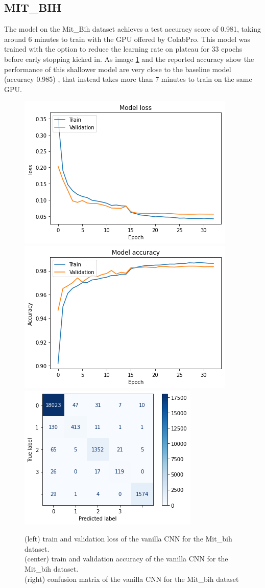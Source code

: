 \documentclass[11pt]{scrartcl}
\begin{document}
\subsection{MIT\_BIH}
The model on the Mit\_Bih dataset achieves a test accuracy score of 0.981, taking around 6 minutes to train with the GPU offered by ColabPro. This model was trained with the option to reduce the learning rate on plateau for 33 epochs before early stopping kicked in.
As image \ref{fig:cnn_mit_three} and the reported accuracy show the performance of this shallower model are very close to the baseline model (accuracy 0.985) , that instead takes more than 7 minutes to train on the same GPU.
\begin{figure}[htp]
\centering
\includegraphics[width=.3\textwidth]{../models_performance_graphs/mit/CNN_mit_train_validation.png}\hfill
\includegraphics[width=.3\textwidth]{../models_performance_graphs/mit/cnn_mit_train_val_acc.png}\hfill
\includegraphics[width=.3\textwidth]{../models_performance_graphs/mit/cnn_mit_confusion.png}
\caption{(left) train and validation loss of the vanilla CNN for the Mit\_bih dataset. \\ (center) train and validation accuracy of the vanilla CNN for the Mit\_bih dataset. \\(right) confusion matrix of the vanilla CNN for the Mit\_bih dataset}
\label{fig:cnn_mit_three}
\end{figure}

\end{document}

